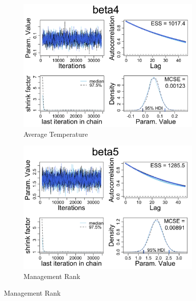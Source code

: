\documentclass[12pt,english]{article}
\begin{document}
\begin{figure}[h]
 
\begin{subfigure}{0.5\textwidth}
\includegraphics[scale = 0.25]{beta4.png} 
\caption{Average Temperature}
\label{fig:beta0}
\end{subfigure}
\begin{subfigure}{0.5\textwidth}
\includegraphics[scale = 0.25]{beta5.png}
\caption{Management Rank}
\label{fig:subim2}
\end{subfigure}
\label{fig:beta1}
\end{figure}
\end{document}
